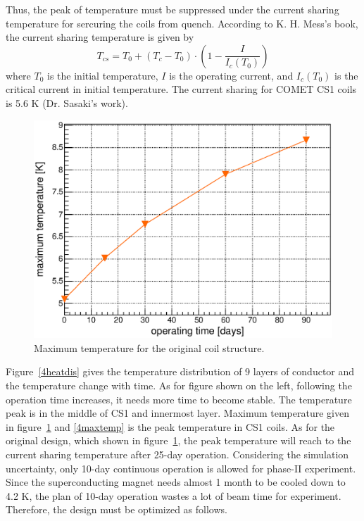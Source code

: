 Thus, the peak of temperature must be suppressed under the current sharing temperature for sercuring the coils from quench.
According to K. H. Mess's book, the current sharing temperature is given by
\begin{equation}
 T_{cs} = T_0 + (T_c - T_0)\cdot (1 - \frac{I}{I_c(T_0)})
\end{equation}
where $T_0$ is the initial temperature, $I$ is the operating current, and $I_c(T_0)$ is the critical current in initial temperature.
The current sharing for COMET CS1 coils is 5.6 K (Dr. Sasaki's work).
\begin{figure}[H]
 \centering
 \includegraphics[scale=0.43]{chapter5/fig/temp.eps}
 \caption{ Maximum temperature for the original coil structure.}
 \label{origin}
\end{figure}
Figure~\ref{4heatdis} gives the temperature distribution of 9 layers of conductor and the temperature change with time.
As for figure shown on the left, following the operation time increases, it needs more time to become stable.
The temperature peak is in the middle of CS1 and innermost layer.
Maximum temperature given in figure~\ref{origin} and \ref{4maxtemp} is the peak temperature in CS1 coils.
As for the original design, which shown in figure~\ref{origin}, the peak temperature will reach to the current sharing temperature after 25-day operation.
Considering the simulation uncertainty, only 10-day continuous operation is allowed for phase-II experiment.
Since the superconducting magnet needs almost 1 month to be cooled down to 4.2 K, the plan of 10-day operation wastes a lot of beam time for experiment.
Therefore, the design must be optimized as follows.
